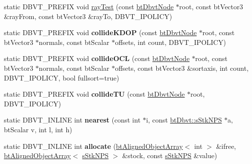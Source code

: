 \begin{DoxyCompactItemize}
\item 
static D\+B\+V\+T\+\_\+\+P\+R\+E\+F\+I\+X void \hyperlink{structbt_dbvt_a8e316ee3bc9bd7b7354086c0c558cfb5}{ray\+Test} (const \hyperlink{structbt_dbvt_node}{bt\+Dbvt\+Node} $\ast$root, const bt\+Vector3 \&ray\+From, const bt\+Vector3 \&ray\+To, D\+B\+V\+T\+\_\+\+I\+P\+O\+L\+I\+C\+Y)
\item 
\hypertarget{structbt_dbvt_a8f00d2d902816fb3bc6ab5b3d69c1ec5}{static D\+B\+V\+T\+\_\+\+P\+R\+E\+F\+I\+X void {\bfseries collide\+K\+D\+O\+P} (const \hyperlink{structbt_dbvt_node}{bt\+Dbvt\+Node} $\ast$root, const bt\+Vector3 $\ast$normals, const bt\+Scalar $\ast$offsets, int count, D\+B\+V\+T\+\_\+\+I\+P\+O\+L\+I\+C\+Y)}\label{structbt_dbvt_a8f00d2d902816fb3bc6ab5b3d69c1ec5}

\item 
\hypertarget{structbt_dbvt_a2aa9c732441a8bb4cbec9c47c02e05c3}{static D\+B\+V\+T\+\_\+\+P\+R\+E\+F\+I\+X void {\bfseries collide\+O\+C\+L} (const \hyperlink{structbt_dbvt_node}{bt\+Dbvt\+Node} $\ast$root, const bt\+Vector3 $\ast$normals, const bt\+Scalar $\ast$offsets, const bt\+Vector3 \&sortaxis, int count, D\+B\+V\+T\+\_\+\+I\+P\+O\+L\+I\+C\+Y, bool fullsort=true)}\label{structbt_dbvt_a2aa9c732441a8bb4cbec9c47c02e05c3}

\item 
\hypertarget{structbt_dbvt_a632a36cd575d45e9f98a002211aee35e}{static D\+B\+V\+T\+\_\+\+P\+R\+E\+F\+I\+X void {\bfseries collide\+T\+U} (const \hyperlink{structbt_dbvt_node}{bt\+Dbvt\+Node} $\ast$root, D\+B\+V\+T\+\_\+\+I\+P\+O\+L\+I\+C\+Y)}\label{structbt_dbvt_a632a36cd575d45e9f98a002211aee35e}

\item 
\hypertarget{structbt_dbvt_a09363b697138f2d1d51fea62ad147f9b}{static D\+B\+V\+T\+\_\+\+I\+N\+L\+I\+N\+E int {\bfseries nearest} (const int $\ast$i, const \hyperlink{structbt_dbvt_1_1s_stk_n_p_s}{bt\+Dbvt\+::s\+Stk\+N\+P\+S} $\ast$a, bt\+Scalar v, int l, int h)}\label{structbt_dbvt_a09363b697138f2d1d51fea62ad147f9b}

\item 
\hypertarget{structbt_dbvt_a0f9c3a3fa62050f132de16de2d362fd1}{static D\+B\+V\+T\+\_\+\+I\+N\+L\+I\+N\+E int {\bfseries allocate} (\hyperlink{classbt_aligned_object_array}{bt\+Aligned\+Object\+Array}$<$ int $>$ \&ifree, \hyperlink{classbt_aligned_object_array}{bt\+Aligned\+Object\+Array}$<$ \hyperlink{structbt_dbvt_1_1s_stk_n_p_s}{s\+Stk\+N\+P\+S} $>$ \&stock, const \hyperlink{structbt_dbvt_1_1s_stk_n_p_s}{s\+Stk\+N\+P\+S} \&value)}\label{structbt_dbvt_a0f9c3a3fa62050f132de16de2d362fd1}

\end{DoxyCompactItemize}
